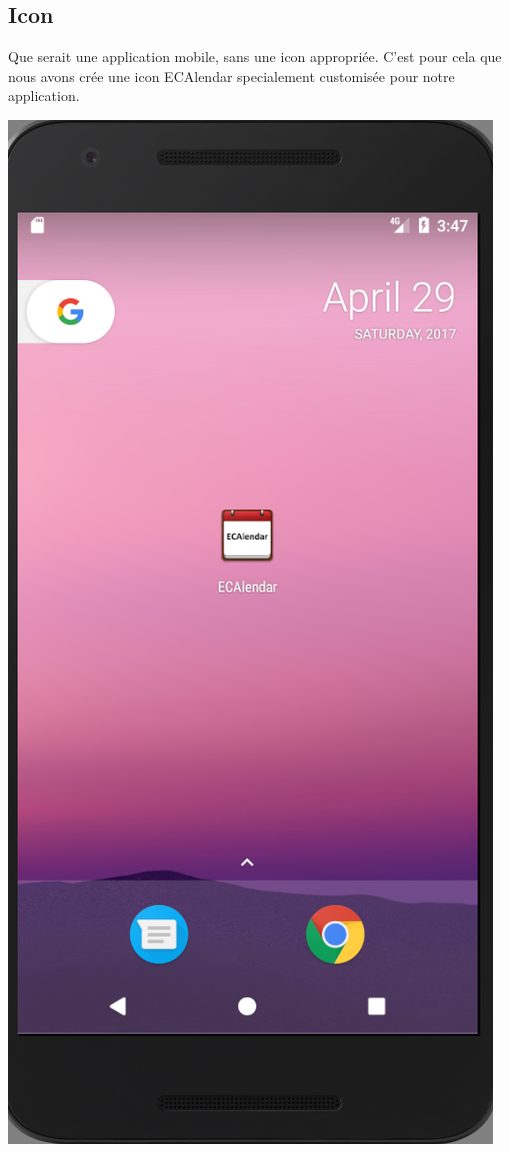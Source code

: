 \documentclass{article}
\begin{document}
	\subsection{Icon}
	 Que serait une application mobile, sans une icon appropri\'ee. C'est pour cela que nous avons cr\'ee une icon ECAlendar specialement customis\'ee pour notre application.
	   \begin{center}
            \includegraphics[scale=0.4]{img/ICON.png}
            \end{center}
\end{document}
